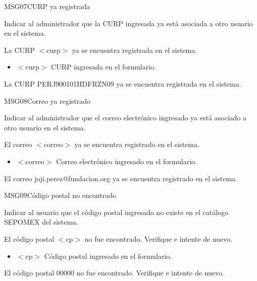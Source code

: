 \begin{cdtMessage}[msgErrorColor]{MSG07}{CURP ya registrada}
	\item[Propósito:] Indicar al administrador que la CURP 
	ingresada ya está asociada a otro usuario en el sistema.
	\item[Redacción:] La CURP $<$curp$>$ ya se encuentra 
	registrada en el sistema.
	\item[Parámetros:] \hspace{1cm}
	\begin{itemize}
		\item $<$curp$>$ CURP ingresada en el formulario.
	\end{itemize}
	\item[Ejemplos:] La CURP PERJ900101HDFRZN09 ya se encuentra 
	registrada en el sistema.
\end{cdtMessage}

\begin{cdtMessage}[msgErrorColor]{MSG08}{Correo ya registrado}
	\item[Propósito:] Indicar al administrador que el correo 
	electrónico ingresado ya está asociado a otro usuario 
	en el sistema.
	\item[Redacción:] El correo $<$correo$>$ ya se encuentra 
	registrado en el sistema.
	\item[Parámetros:] \hspace{1cm}
	\begin{itemize}
		\item $<$correo$>$ Correo electrónico ingresado 
		en el formulario.
	\end{itemize}
	\item[Ejemplos:] El correo joji.perez@fundacion.org ya 
	se encuentra registrado en el sistema.
\end{cdtMessage}

\begin{cdtMessage}[msgErrorColor]{MSG09}{Código postal no encontrado}
	\item[Propósito:] Indicar al usuario que el código postal 
	ingresado no existe en el catálogo SEPOMEX del sistema.
	\item[Redacción:] El código postal $<$cp$>$ no fue encontrado. 
	Verifique e intente de nuevo.
	\item[Parámetros:] \hspace{1cm}
	\begin{itemize}
		\item $<$cp$>$ Código postal ingresado en el formulario.
	\end{itemize}
	\item[Ejemplos:] El código postal 00000 no fue encontrado. 
	Verifique e intente de nuevo.
\end{cdtMessage}

